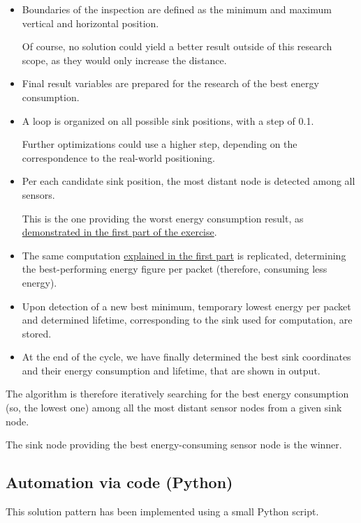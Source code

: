 \documentclass[a4paper,11pt]{article} %
\begin{document}
    \begin{itemize}
        \item Boundaries of the inspection are defined as the minimum and maximum vertical and horizontal position.

        Of course, no solution could yield a better result outside of this research scope, as they would only increase the distance.
        \item Final result variables are prepared for the research of the best energy consumption.
        \item A loop is organized on all possible sink positions, with a step of 0.1.

        Further optimizations could use a higher step, depending on the correspondence to the real-world positioning.
        \item Per each candidate sink position, the most distant node is detected among all sensors.

        This is the one providing the worst energy consumption result, as \hyperref[subsec:solution-sketch]{demonstrated in the first part of the exercise}.
        \item The same computation \hyperref[subsec:solution-sketch]{explained in the first part} is replicated, determining the best-performing energy figure per packet (therefore, consuming less energy).
        \item Upon detection of a new best minimum, temporary lowest energy per packet and determined lifetime, corresponding to the sink used for computation, are stored.
        \item At the end of the cycle, we have finally determined the best sink coordinates and their energy consumption and lifetime, that are shown in output.
    \end{itemize}

    The algorithm is therefore iteratively searching for the best energy consumption (so, the lowest one) among all the most distant sensor nodes from a given sink node.

    The sink node providing the best energy-consuming sensor node is the winner.

    \subsection{Automation via code (Python)}\label{subsec:automation-via-code-(python)2}

    This solution pattern has been implemented using a small Python script.
\end{document}

